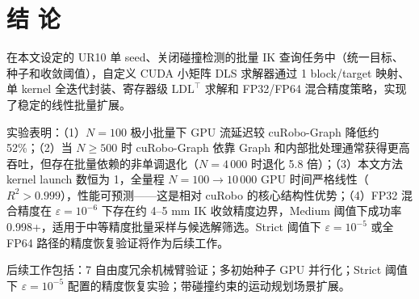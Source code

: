 \documentclass[twocolumn,a4paper,10pt]{ctexart}
\begin{document}
\section{结 论}

在本文设定的 UR10 单 seed、关闭碰撞检测的批量 IK 查询任务中（统一目标、种子和收敛阈值），自定义 CUDA 小矩阵 DLS 求解器通过 1 block/target 映射、单 kernel 全迭代封装、寄存器级 $\mathrm{LDL}^\top$ 求解和 FP32/FP64 混合精度策略，实现了稳定的线性批量扩展。

实验表明：（1）$N=100$ 极小批量下 GPU 流延迟较 cuRobo-Graph 降低约 52\%；（2）当 $N\ge500$ 时 cuRobo-Graph 依靠 Graph 和内部批处理通常获得更高吞吐，但存在批量依赖的非单调退化（$N=4\,000$ 时退化 5.8 倍）；（3）本文方法 kernel launch 数恒为 1，全量程 $N=100\to10\,000$ GPU 时间严格线性（$R^2>0.999$），性能可预测——这是相对 cuRobo 的核心结构性优势；（4）FP32 混合精度在 $\varepsilon=10^{-6}$ 下存在约 4--5 mm IK 收敛精度边界，Medium 阈值下成功率 0.998+，适用于中等精度批量采样与候选解筛选。Strict 阈值下 $\varepsilon=10^{-5}$ 或全 FP64 路径的精度恢复验证将作为后续工作。

后续工作包括：7 自由度冗余机械臂验证；多初始种子 GPU 并行化；Strict 阈值下 $\varepsilon=10^{-5}$ 配置的精度恢复实验；带碰撞约束的运动规划场景扩展。
\end{document}
